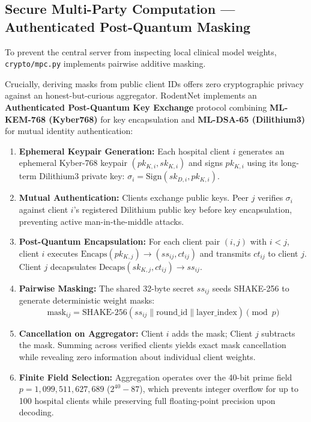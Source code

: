 \documentclass[11pt,a4paper]{article}
\begin{document}
\subsection{Secure Multi-Party Computation --- Authenticated Post-Quantum Masking}
To prevent the central server from inspecting local clinical model weights, \lstinline|crypto/mpc.py| implements pairwise additive masking. 

Crucially, deriving masks from public client IDs offers zero cryptographic privacy against an honest-but-curious aggregator. RodentNet implements an \textbf{Authenticated Post-Quantum Key Exchange} protocol combining \textbf{ML-KEM-768 (Kyber768)} for key encapsulation and \textbf{ML-DSA-65 (Dilithium3)} for mutual identity authentication:

\begin{enumerate}[itemsep=2pt]
  \item \textbf{Ephemeral Keypair Generation:} Each hospital client $i$ generates an ephemeral Kyber-768 keypair $(pk_{K, i}, sk_{K, i})$ and signs $pk_{K, i}$ using its long-term Dilithium3 private key: $\sigma_i = \text{Sign}(sk_{D, i}, pk_{K, i})$.
  \item \textbf{Mutual Authentication:} Clients exchange public keys. Peer $j$ verifies $\sigma_i$ against client $i$'s registered Dilithium public key before key encapsulation, preventing active man-in-the-middle attacks.
  \item \textbf{Post-Quantum Encapsulation:} For each client pair $(i, j)$ with $i < j$, client $i$ executes $\text{Encaps}(pk_{K, j}) \to (ss_{ij}, ct_{ij})$ and transmits $ct_{ij}$ to client $j$. Client $j$ decapsulates $\text{Decaps}(sk_{K, j}, ct_{ij}) \to ss_{ij}$.
  \item \textbf{Pairwise Masking:} The shared 32-byte secret $ss_{ij}$ seeds SHAKE-256 to generate deterministic weight masks:
  \[
  \text{mask}_{ij} = \text{SHAKE-256}(ss_{ij} \parallel \text{round\_id} \parallel \text{layer\_index}) \pmod{p}
  \]
  \item \textbf{Cancellation on Aggregator:} Client $i$ adds the mask; Client $j$ subtracts the mask. Summing across verified clients yields exact mask cancellation while revealing zero information about individual client weights.
  \item \textbf{Finite Field Selection:} Aggregation operates over the 40-bit prime field $p = 1{,}099{,}511{,}627{,}689$ ($2^{40}-87$), which prevents integer overflow for up to 100 hospital clients while preserving full floating-point precision upon decoding.
\end{enumerate}
\end{document}
